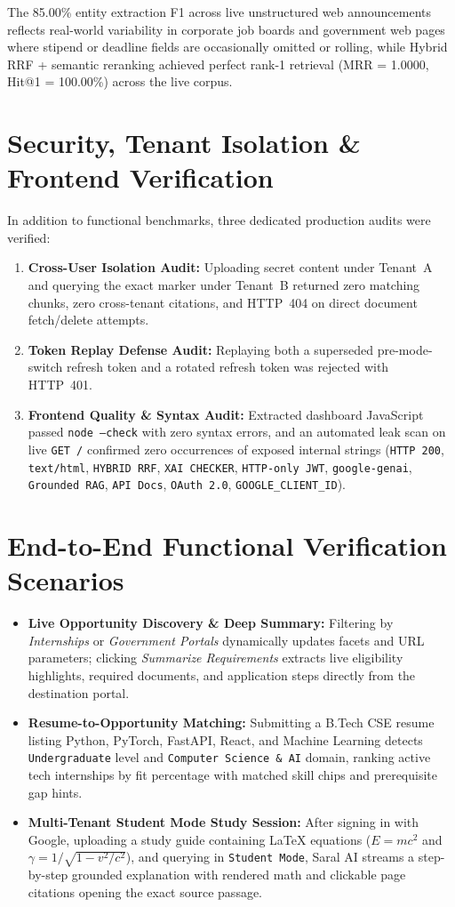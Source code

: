 \documentclass[12pt,a4paper,oneside]{report}
\begin{document}
The 85.00\% entity extraction F1 across live unstructured web announcements reflects real-world variability in corporate job boards and government web pages where stipend or deadline fields are occasionally omitted or rolling, while Hybrid RRF + semantic reranking achieved perfect rank-1 retrieval (MRR = 1.0000, Hit@1 = 100.00\%) across the live corpus.

\section{Security, Tenant Isolation \& Frontend Verification}
In addition to functional benchmarks, three dedicated production audits were verified:
\begin{enumerate}[itemsep=2pt]
    \item \textbf{Cross-User Isolation Audit:} Uploading secret content under Tenant~A and querying the exact marker under Tenant~B returned zero matching chunks, zero cross-tenant citations, and HTTP~404 on direct document fetch/delete attempts.
    \item \textbf{Token Replay Defense Audit:} Replaying both a superseded pre-mode-switch refresh token and a rotated refresh token was rejected with HTTP~401.
    \item \textbf{Frontend Quality \& Syntax Audit:} Extracted dashboard JavaScript passed \texttt{node --check} with zero syntax errors, and an automated leak scan on live \texttt{GET /} confirmed zero occurrences of exposed internal strings (\texttt{HTTP 200}, \texttt{text/html}, \texttt{HYBRID RRF}, \texttt{XAI CHECKER}, \texttt{HTTP-only JWT}, \texttt{google-genai}, \texttt{Grounded RAG}, \texttt{API Docs}, \texttt{OAuth 2.0}, \texttt{GOOGLE\_CLIENT\_ID}).
\end{enumerate}

\section{End-to-End Functional Verification Scenarios}
\begin{itemize}[itemsep=2pt]
    \item \textbf{Live Opportunity Discovery \& Deep Summary:} Filtering by \textit{Internships} or \textit{Government Portals} dynamically updates facets and URL parameters; clicking \textit{Summarize Requirements} extracts live eligibility highlights, required documents, and application steps directly from the destination portal.
    \item \textbf{Resume-to-Opportunity Matching:} Submitting a B.Tech CSE resume listing Python, PyTorch, FastAPI, React, and Machine Learning detects \texttt{Undergraduate} level and \texttt{Computer Science \& AI} domain, ranking active tech internships by fit percentage with matched skill chips and prerequisite gap hints.
    \item \textbf{Multi-Tenant Student Mode Study Session:} After signing in with Google, uploading a study guide containing LaTeX equations ($E = mc^2$ and $\gamma = 1/\sqrt{1 - v^2/c^2}$), and querying in \texttt{Student Mode}, Saral AI streams a step-by-step grounded explanation with rendered math and clickable page citations opening the exact source passage.
\end{itemize}
\end{document}
